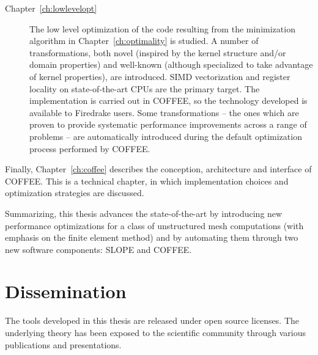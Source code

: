 \begin{description}
\item[Chapter~\ref{ch:lowlevelopt}] The low level optimization of the code resulting from the minimization algorithm in Chapter~\ref{ch:optimality} is studied. A number of transformations, both novel (inspired by the kernel structure and/or domain properties) and well-known (although specialized to take advantage of kernel properties), are introduced. SIMD vectorization and register locality on state-of-the-art CPUs are the primary target. The implementation is carried out in COFFEE, so the technology developed is available to Firedrake users. Some transformations -- the ones which are proven to provide systematic performance improvements across a range of problems -- are automatically introduced during the default optimization process performed by COFFEE.
\end{description}

Finally, Chapter~\ref{ch:coffee} describes the conception, architecture and interface of COFFEE. This is a technical chapter, in which implementation choices and optimization strategies are discussed.

Summarizing, this thesis advances the state-of-the-art by introducing new performance optimizations for a class of unstructured mesh computations (with emphasis on the finite element method) and by automating them through two new software components: SLOPE and COFFEE.


\section{Dissemination}
The tools developed in this thesis are released under open source licenses. The underlying theory has been exposed to the scientific community through various publications and presentations.


